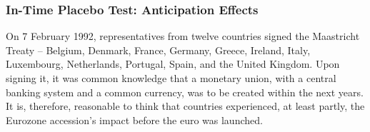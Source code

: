 \documentclass[12pt]{article}
\begin{document}



\subsubsection{In-Time Placebo Test: Anticipation Effects \label{SS_timeplacebo}}

On 7 February 1992, representatives from twelve countries signed the Maastricht Treaty  – Belgium, Denmark, France, Germany, Greece, Ireland, Italy, Luxembourg, Netherlands, Portugal, Spain, and the United Kingdom. Upon signing it, it was common knowledge that a monetary union, with a central banking system and a common currency, was to be created within the next years. It is, therefore, reasonable to think that countries experienced, at least partly, the Eurozone accession's impact before the euro was launched. 
\end{document}
